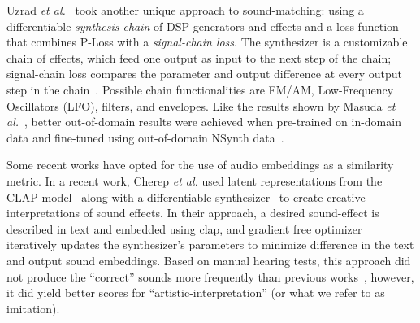 \documentclass[lettersize,journal]{IEEEtran}
\providecommand{\gls}[1]{#1}
\begin{document}
Uzrad \textit{et al.}~\cite{uzrad2024diffmoog} took another unique approach to sound-matching: using a differentiable \textit{synthesis chain} of DSP generators and effects and a loss function that combines P-Loss with a \textit{signal-chain loss}. The synthesizer is a customizable chain of effects, which feed one output as input to the next step of the chain; signal-chain loss compares the parameter and output difference at every output step in the chain~\cite{uzrad2024diffmoog}. Possible chain functionalities are FM/AM, Low-Frequency Oscillators (\gls{LFO}), filters, and envelopes. Like the results shown by Masuda \textit{et al.}~\cite{masuda2021soundmatch}, better out-of-domain results were achieved when pre-trained on in-domain data and fine-tuned using out-of-domain NSynth data~\cite{engel2017neural}.


Some recent works have opted for the use of audio embeddings as a similarity metric. In a recent work, Cherep \textit{et al.} used latent representations from the CLAP model~\cite{wu2023large} along with a differentiable synthesizer~\cite{synthhaxcherep2023} to create creative interpretations of sound effects. In their approach, a desired sound-effect is described in text and embedded using clap, and gradient free optimizer~\cite{evosax2022github} iteratively updates the synthesizer's parameters to minimize difference in the text and output sound embeddings. Based on manual hearing tests, this approach did not produce the ``correct'' sounds more frequently than previous works~\cite{kreuk2022audiogen}, however, it did yield better scores for ``artistic-interpretation'' (or what we refer to as imitation). 


\end{document}
